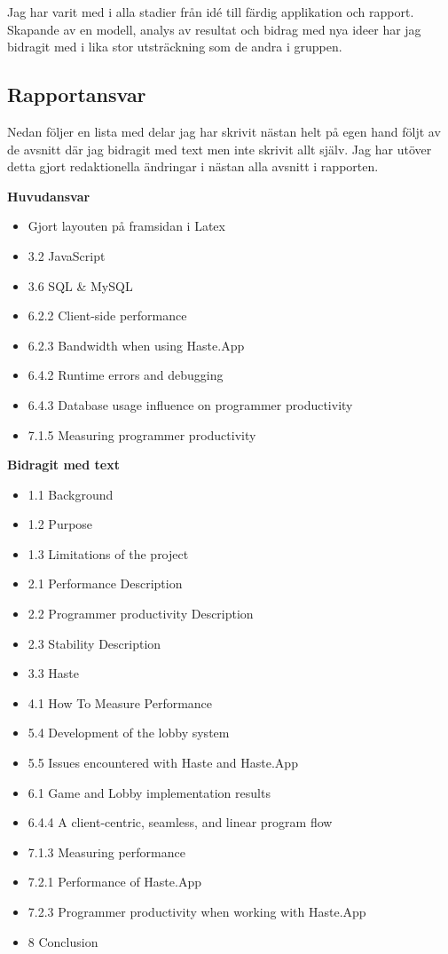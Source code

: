 Jag har varit med i alla stadier från idé till färdig applikation och rapport.
Skapande av en modell, analys av resultat och bidrag med nya ideer har jag bidragit med i lika stor utsträckning som de andra i gruppen.

\subsection{Rapportansvar}


Nedan följer en lista med delar jag har skrivit nästan helt på egen hand följt av de avsnitt där jag bidragit med text men inte skrivit allt själv.
Jag har utöver detta gjort redaktionella ändringar i nästan alla avsnitt i rapporten.

\textbf{Huvudansvar}
\begin{itemize}
    \item Gjort layouten på framsidan i Latex
    \item 3.2 JavaScript
    \item 3.6 SQL \& MySQL
    \item 6.2.2 Client-side performance
    \item 6.2.3 Bandwidth when using Haste.App
    \item 6.4.2 Runtime errors and debugging
    \item 6.4.3 Database usage influence on programmer productivity
    \item 7.1.5 Measuring programmer productivity
\end{itemize}

\textbf{Bidragit med text}
\begin{itemize}
    \item 1.1 Background
    \item 1.2 Purpose
    \item 1.3 Limitations of the project
    \item 2.1 Performance Description
    \item 2.2 Programmer productivity Description
    \item 2.3 Stability Description
    \item 3.3 Haste
    \item 4.1 How To Measure Performance
    \item 5.4 Development of the lobby system
    \item 5.5 Issues encountered with Haste and Haste.App
    \item 6.1 Game and Lobby implementation results
    \item 6.4.4 A client-centric, seamless, and linear program flow
    \item 7.1.3 Measuring performance
    \item 7.2.1 Performance of Haste.App
    \item 7.2.3 Programmer productivity when working with Haste.App
    \item 8 Conclusion
\end{itemize}


